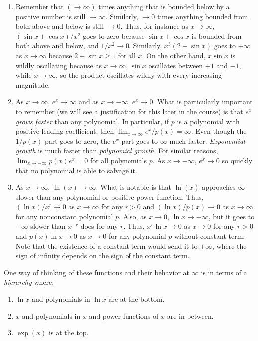 \documentclass[10pt]{amsart}
\begin{document}
\begin{enumerate}
\item Remember that $(\to \infty)$ times anything that is bounded
  below by a positive number is still $\to \infty$. Similarly, $\to 0$
  times anything bounded from both above and below is still $\to
  0$. Thus, for instance as $x \to \infty$, $(\sin x + \cos x)/x^2$
  goes to zero because $\sin x + \cos x$ is bounded from both above
  and below, and $1/x^2 \to 0$. Similarly, $x^3(2 + \sin x)$ goes to
  $+\infty$ as $x \to \infty$ because $2 + \sin x \ge 1$ for all
  $x$. On the other hand, $x\sin x$ is wildly oscillating because as
  $x \to \infty$, $\sin x$ oscillates between $+1 $ and $-1$, while $x
  \to \infty$, so the product oscillates wildly with every-increasing
  magnitude.
\item As $x \to \infty$, $e^x \to \infty$ and as $x \to -\infty$, $e^x
  \to 0$. What is particularly important to remember (we will see a
  justification for this later in the course) is that $e^x$ {\em grows
  faster} than any polynomial. In particular, if $p$ is a polynomial
  with positive leading coefficient, then $\lim_{x \to \infty}
  e^x/p(x) = \infty$. Even though the $1/p(x)$ part goes to zero, the
  $e^x$ part goes to $\infty$ much faster. {\em Exponential growth} is
  much faster than {\em polynomial growth}. For similar reasons,
  $\lim_{x \to -\infty} p(x)e^x = 0$ for all polynomials $p$. As $x
  \to -\infty$, $e^x \to 0$ so quickly that no polynomial is able to
  salvage it.
\item As $x \to \infty$, $\ln(x) \to \infty$. What is notable is that
  $\ln(x)$ approaches $\infty$ slower than any polynomial or positive
  power function. Thus, $(\ln x)/x^r \to 0$ as $x \to \infty$ for any
  $r > 0$ and $(\ln x)/p(x) \to 0$ as $x \to \infty$ for any
  nonconstant polynomial $p$. Also, as $x \to 0$, $\ln x \to -\infty$,
  but it goes to $-\infty$ slower than $x^{-r}$ does for any
  $r$. Thus, $x^r \ln x \to 0$ as $x \to 0$ for any $r > 0$ and $p(x)
  \ln x \to 0$ as $x \to 0$ for any polynomial $p$ without constant
  term. Note that the existence of a constant term would send it to
  $\pm \infty$, where the sign of infinity depends on the sign of the
  constant term.
\end{enumerate}

One way of thinking of these functions and their behavior
at $\infty$ is in terms of a {\em hierarchy} where:

\begin{enumerate}
\item $\ln x$ and polynomials in $\ln x$ are at the bottom.
\item $x$ and polynomials in $x$ and power functions of $x$ are in between.
\item $\exp(x)$ is at the top.
\end{enumerate}
\end{document}
